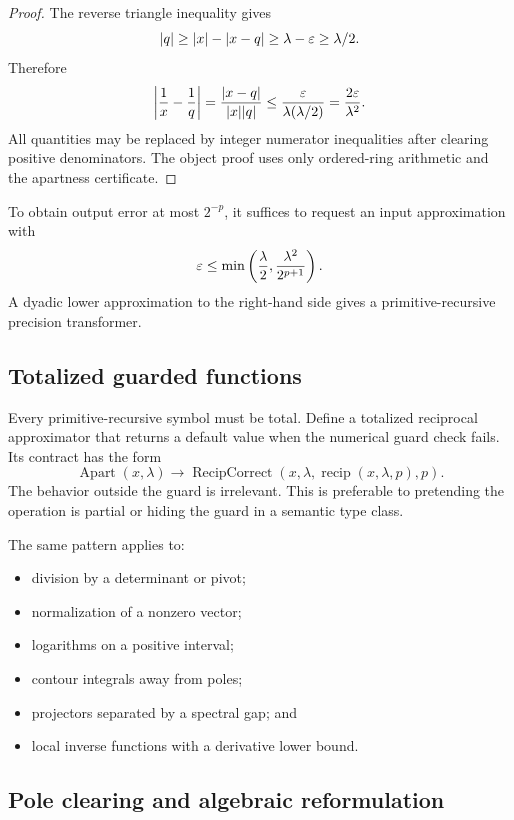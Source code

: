 \begin{proof}
The reverse triangle inequality gives
\[
  \lvert q\rvert\ge\lvert x\rvert-\lvert x-q\rvert
            \ge\lambda-\varepsilon\ge\lambda/2.
\]
Therefore
\[
 \left|\frac1x-\frac1q\right|
 =\frac{\lvert x-q\rvert}{\lvert x\rvert\lvert q\rvert}
 \le\frac{\varepsilon}{\lambda(\lambda/2)}
 =\frac{2\varepsilon}{\lambda^2}.
\]
All quantities may be replaced by integer numerator inequalities after clearing
positive denominators.  The object proof uses only ordered-ring arithmetic and the
apartness certificate.
\end{proof}

To obtain output error at most \(2^{-p}\), it suffices to request an input approximation
with
\[
  \varepsilon\le\min\left(\frac\lambda2,
                        \frac{\lambda^2}{2^{p+1}}\right).
\]
A dyadic lower approximation to the right-hand side gives a primitive-recursive
precision transformer.

\subsection{Totalized guarded functions}

Every primitive-recursive symbol must be total.  Define a totalized reciprocal
approximator that returns a default value when the numerical guard check fails.  Its
contract has the form
\[
  \operatorname{Apart}(x,\lambda)
  \longrightarrow
  \operatorname{RecipCorrect}(x,\lambda,\operatorname{recip}(x,\lambda,p),p).
\]
The behavior outside the guard is irrelevant.  This is preferable to pretending the
operation is partial or hiding the guard in a semantic type class.

The same pattern applies to:

\begin{itemize}
\item division by a determinant or pivot;
\item normalization of a nonzero vector;
\item logarithms on a positive interval;
\item contour integrals away from poles;
\item projectors separated by a spectral gap; and
\item local inverse functions with a derivative lower bound.
\end{itemize}

\subsection{Pole clearing and algebraic reformulation}

